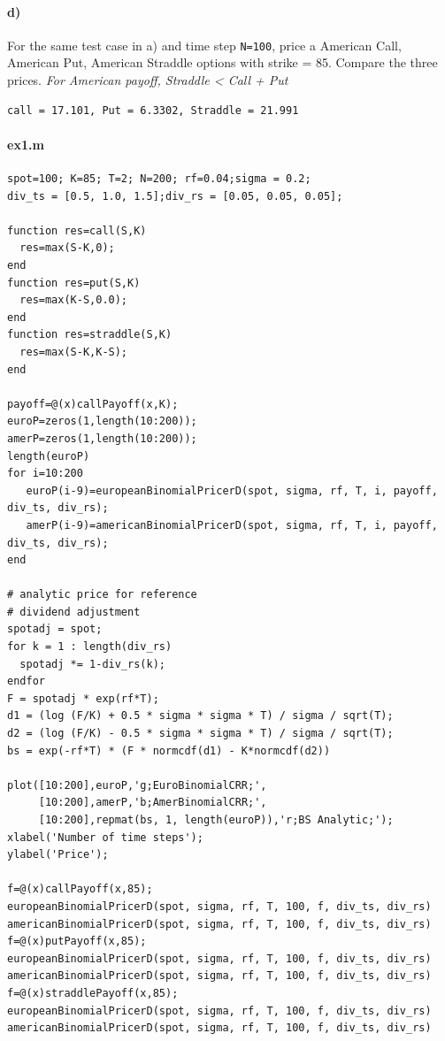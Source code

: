 \documentclass[12pt,a4paper,hidelinks,fleqn]{article}            %
\begin{document}
\vspace{-1cm}
\paragraph{d)} For the same test case in a) and time step \verb-N=100-, 
price a American Call, American Put, American Straddle options with strike = 85. 
Compare the three prices.
\emph{For American payoff, Straddle < Call + Put}
\begin{verbatim}
call = 17.101, Put = 6.3302, Straddle = 21.991
\end{verbatim}


\paragraph{ex1.m}
\begin{small}
\begin{verbatim}
spot=100; K=85; T=2; N=200; rf=0.04;sigma = 0.2;
div_ts = [0.5, 1.0, 1.5];div_rs = [0.05, 0.05, 0.05];

function res=call(S,K)
  res=max(S-K,0);
end 
function res=put(S,K)
  res=max(K-S,0.0);
end 
function res=straddle(S,K)
  res=max(S-K,K-S);
end 

payoff=@(x)callPayoff(x,K);
euroP=zeros(1,length(10:200));
amerP=zeros(1,length(10:200));
length(euroP)
for i=10:200
   euroP(i-9)=europeanBinomialPricerD(spot, sigma, rf, T, i, payoff, div_ts, div_rs);
   amerP(i-9)=americanBinomialPricerD(spot, sigma, rf, T, i, payoff, div_ts, div_rs);
end 

# analytic price for reference
# dividend adjustment
spotadj = spot;
for k = 1 : length(div_rs)
  spotadj *= 1-div_rs(k);
endfor
F = spotadj * exp(rf*T);
d1 = (log (F/K) + 0.5 * sigma * sigma * T) / sigma / sqrt(T);
d2 = (log (F/K) - 0.5 * sigma * sigma * T) / sigma / sqrt(T); 
bs = exp(-rf*T) * (F * normcdf(d1) - K*normcdf(d2))

plot([10:200],euroP,'g;EuroBinomialCRR;',
     [10:200],amerP,'b;AmerBinomialCRR;',
     [10:200],repmat(bs, 1, length(euroP)),'r;BS Analytic;');
xlabel('Number of time steps');
ylabel('Price');

f=@(x)callPayoff(x,85);
europeanBinomialPricerD(spot, sigma, rf, T, 100, f, div_ts, div_rs)
americanBinomialPricerD(spot, sigma, rf, T, 100, f, div_ts, div_rs)
f=@(x)putPayoff(x,85);
europeanBinomialPricerD(spot, sigma, rf, T, 100, f, div_ts, div_rs)
americanBinomialPricerD(spot, sigma, rf, T, 100, f, div_ts, div_rs)
f=@(x)straddlePayoff(x,85);
europeanBinomialPricerD(spot, sigma, rf, T, 100, f, div_ts, div_rs)
americanBinomialPricerD(spot, sigma, rf, T, 100, f, div_ts, div_rs)
\end{verbatim}

\end{small}
\end{document}
